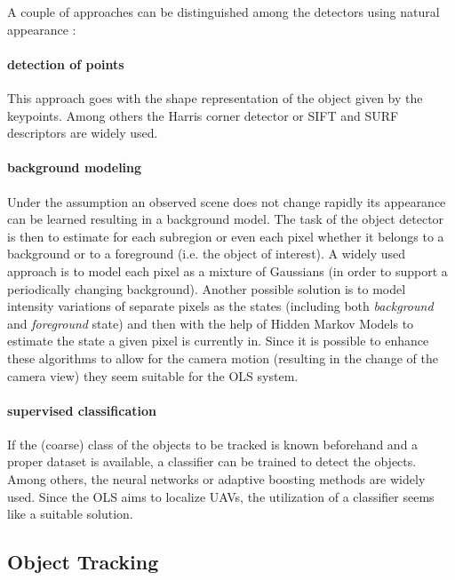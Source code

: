 A couple of approaches can be distinguished among the detectors using natural appearance \cite{Yilmaz:2006:OTS:1177352.1177355}:

\paragraph{detection of points} This approach goes with the shape representation of the object given by the keypoints. Among others the Harris corner detector or SIFT and SURF descriptors are widely used.

\paragraph{background modeling} Under the assumption an observed scene does not change rapidly its appearance can be learned resulting in a background model. The task of the object detector is then to estimate for each subregion or even each pixel whether it belongs to a background or to a foreground (i.e. the object of interest). A widely used approach is to model each pixel as a mixture of Gaussians (in order to support a periodically changing background). Another possible solution is to model intensity variations of separate pixels as the states (including both \textit{background} and \textit{foreground} state) and then with the help of Hidden Markov Models to estimate the state a given pixel is currently in. Since it is possible to enhance these algorithms to allow for the camera motion (resulting in the change of the camera view) they seem suitable for the OLS system. 

\paragraph{supervised classification} If the (coarse) class of the objects to be tracked is known beforehand and a proper dataset is available, a classifier can be trained to detect the objects. Among others, the neural networks or adaptive boosting methods are widely used. Since the OLS aims to localize UAVs, the utilization of a classifier seems like a suitable solution.

\subsection{Object Tracking}

